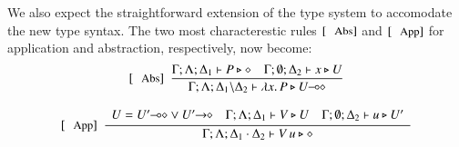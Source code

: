 We also expect the straightforward extension of the type 
system to accomodate the new type syntax. The two
most characterestic rules $\trule{Abs}$ and $\trule{App}$ 
for application and abstraction, respectively, now become:
\[
	\begin{array}{c}
		\trule{Abs}~~\tree{
			\Gamma; \Lambda; \Delta_1 \proves P \hastype \Proc
			\quad
			\Gamma; \es; \Delta_2 \proves x \hastype U
		}{
			\Gamma; \Lambda; \Delta_1 \backslash \Delta_2 \proves \abs{x}{P} \hastype \lhot{U}
		}
		\\[6mm]

		\trule{App}~~\tree{
			\begin{array}{c}
				U = \lhot{U'} \lor \shot{U'}
				\quad
				\Gamma; \Lambda; \Delta_1 \proves V \hastype U
				\quad
				\Gamma; \es; \Delta_2 \proves u \hastype U'
			\end{array}
		}{
			\Gamma; \Lambda; \Delta_1 \cat \Delta_2 \proves \appl{V}{u} \hastype \Proc
		} 
	\end{array}
\]


